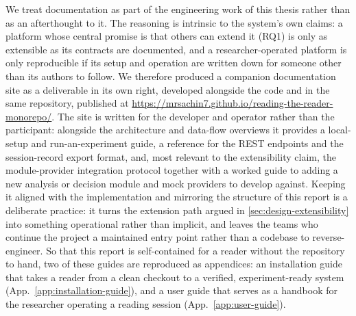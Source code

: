 We treat documentation as part of the engineering work of this thesis rather than as an afterthought to it.
The reasoning is intrinsic to the system's own claims: a platform whose central promise is that others can extend it (RQ1) is only as extensible as its contracts are documented, and a researcher-operated platform is only reproducible if its setup and operation are written down for someone other than its authors to follow.
We therefore produced a companion documentation site as a deliverable in its own right, developed alongside the code and in the same repository, published at \url{https://mrsachin7.github.io/reading-the-reader-monorepo/}.
The site is written for the developer and operator rather than the participant: alongside the architecture and data-flow overviews it provides a local-setup and run-an-experiment guide, a reference for the REST endpoints and the session-record export format, and, most relevant to the extensibility claim, the module-provider integration protocol together with a worked guide to adding a new analysis or decision module and mock providers to develop against.
Keeping it aligned with the implementation and mirroring the structure of this report is a deliberate practice: it turns the extension path argued in \cref{sec:design-extensibility} into something operational rather than implicit, and leaves the teams who continue the project a maintained entry point rather than a codebase to reverse-engineer.
So that this report is self-contained for a reader without the repository to hand, two of these guides are reproduced as appendices: an installation guide that takes a reader from a clean checkout to a verified, experiment-ready system (App.~\ref{app:installation-guide}), and a user guide that serves as a handbook for the researcher operating a reading session (App.~\ref{app:user-guide}).
